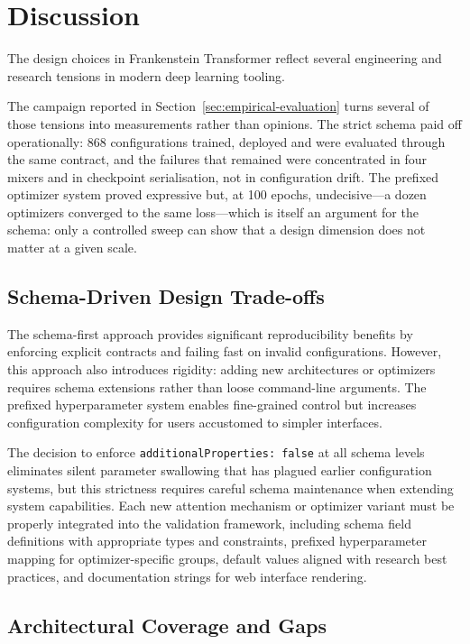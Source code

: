 \section{Discussion}
\label{sec:discussion}

The design choices in Frankenstein Transformer reflect several engineering and research tensions in modern deep learning tooling.

The campaign reported in Section~\ref{sec:empirical-evaluation} turns several of those tensions into measurements rather than opinions. The strict schema paid off operationally: 868 configurations trained, deployed and were evaluated through the same contract, and the failures that remained were concentrated in four mixers and in checkpoint serialisation, not in configuration drift. The prefixed optimizer system proved expressive but, at 100 epochs, undecisive---a dozen optimizers converged to the same loss---which is itself an argument for the schema: only a controlled sweep can show that a design dimension does not matter at a given scale.

\subsection{Schema-Driven Design Trade-offs}

The schema-first approach provides significant reproducibility benefits by enforcing explicit contracts and failing fast on invalid configurations. However, this approach also introduces rigidity: adding new architectures or optimizers requires schema extensions rather than loose command-line arguments. The prefixed hyperparameter system enables fine-grained control but increases configuration complexity for users accustomed to simpler interfaces.

The decision to enforce \texttt{additionalProperties: false} at all schema levels eliminates silent parameter swallowing that has plagued earlier configuration systems, but this strictness requires careful schema maintenance when extending system capabilities. Each new attention mechanism or optimizer variant must be properly integrated into the validation framework, including schema field definitions with appropriate types and constraints, prefixed hyperparameter mapping for optimizer-specific groups, default values aligned with research best practices, and documentation strings for web interface rendering.

\subsection{Architectural Coverage and Gaps}

